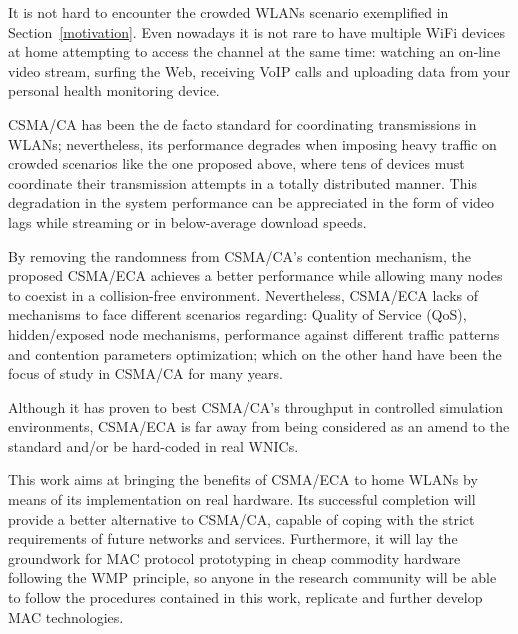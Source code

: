 It is not hard to encounter the crowded WLANs scenario exemplified in Section~\ref{motivation}. Even nowadays it is not rare to have multiple WiFi devices at home attempting to access the channel at the same time: watching an on-line video stream, surfing the Web, receiving VoIP calls and uploading data from your personal health monitoring device.

CSMA/CA has been the de facto standard for coordinating transmissions in WLANs; nevertheless, its performance degrades when imposing heavy traffic on crowded scenarios like the one proposed above, where tens of devices must coordinate their transmission attempts in a totally distributed manner. This degradation in the system performance can be appreciated in the form of video lags while streaming or in below-average download speeds.

By removing the randomness from CSMA/CA's contention mechanism, the proposed CSMA/ECA achieves a better performance while allowing many nodes to coexist in a collision-free environment. Nevertheless, CSMA/ECA lacks of mechanisms to face different scenarios regarding: Quality of Service (QoS), hidden/exposed node mechanisms, performance against different traffic patterns and contention parameters optimization; which on the other hand have been the focus of study in CSMA/CA for many years.

Although it has proven to best CSMA/CA's throughput in controlled simulation environments, CSMA/ECA is far away from being considered as an amend to the standard and/or be hard-coded in real WNICs.

This work aims at bringing the benefits of CSMA/ECA to home WLANs by means of its implementation on real hardware. Its successful completion will provide a better alternative to CSMA/CA, capable of coping with the strict requirements of future networks and services. Furthermore, it will lay the groundwork for MAC protocol prototyping in cheap commodity hardware following the WMP principle, so anyone in the research community will be able to follow the procedures contained in this work, replicate and further develop MAC technologies.